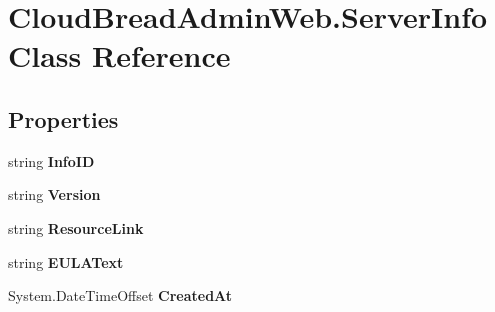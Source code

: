 \hypertarget{class_cloud_bread_admin_web_1_1_server_info}{}\section{Cloud\+Bread\+Admin\+Web.\+Server\+Info Class Reference}
\label{class_cloud_bread_admin_web_1_1_server_info}
\subsection*{Properties}
\begin{DoxyCompactItemize}
\item 
string {\bfseries Info\+ID}\hypertarget{class_cloud_bread_admin_web_1_1_server_info_accdcdfc1ab4e23514b0f8f4c015e8373}{}\label{class_cloud_bread_admin_web_1_1_server_info_accdcdfc1ab4e23514b0f8f4c015e8373}

\item 
string {\bfseries Version}\hypertarget{class_cloud_bread_admin_web_1_1_server_info_ad57bcb8012a019e9b0215ae4ece28b0b}{}\label{class_cloud_bread_admin_web_1_1_server_info_ad57bcb8012a019e9b0215ae4ece28b0b}

\item 
string {\bfseries Resource\+Link}\hypertarget{class_cloud_bread_admin_web_1_1_server_info_ad7a6b91f540b9af762f3ad8f5b28a93e}{}\label{class_cloud_bread_admin_web_1_1_server_info_ad7a6b91f540b9af762f3ad8f5b28a93e}

\item 
string {\bfseries E\+U\+L\+A\+Text}\hypertarget{class_cloud_bread_admin_web_1_1_server_info_a1e5b8106ec76a448170ea297b37dfe59}{}\label{class_cloud_bread_admin_web_1_1_server_info_a1e5b8106ec76a448170ea297b37dfe59}

\item 
System.\+Date\+Time\+Offset {\bfseries Created\+At}\hypertarget{class_cloud_bread_admin_web_1_1_server_info_a49ee6d1cd64f5585dd058feb609a7b0a}{}\label{class_cloud_bread_admin_web_1_1_server_info_a49ee6d1cd64f5585dd058feb609a7b0a}


\end{DoxyCompactItemize}
